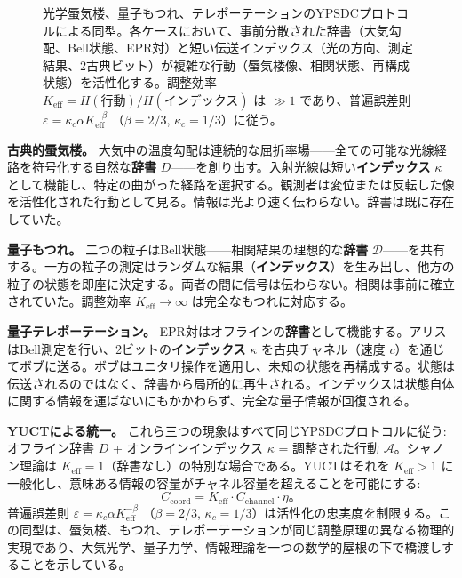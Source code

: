 \documentclass[12pt,a4paper]{article}
\theoremstyle{definition}
\theoremstyle{remark}
\begin{document}
\begin{figure}[htbp]
{%
		}
		\caption{光学蜃気楼、量子もつれ、テレポーテーションのYPSDCプロトコルによる同型。各ケースにおいて、事前分散された辞書（大気勾配、Bell状態、EPR対）と短い伝送インデックス（光の方向、測定結果、2古典ビット）が複雑な行動（蜃気楼像、相関状態、再構成状態）を活性化する。調整効率 $K_{\mathrm{eff}} = H(\text{行動})/H(\text{インデックス})$ は $\gg 1$ であり、普遍誤差則 $\varepsilon = \kappa_c \alpha K_{\mathrm{eff}}^{-\beta}$ （$\beta=2/3$, $\kappa_c=1/3$）に従う。}
		\label{fig:mirage-ypsdc}
	\end{figure}
	
	\textbf{古典的蜃気楼。}
	大気中の温度勾配は連続的な屈折率場——全ての可能な光線経路を符号化する自然な\textbf{辞書} $D$——を創り出す。入射光線は短い\textbf{インデックス} $\kappa$ として機能し、特定の曲がった経路を選択する。観測者は変位または反転した像を活性化された行動として見る。情報は光より速く伝わらない。辞書は既に存在していた。
	
	\textbf{量子もつれ。}
	二つの粒子はBell状態——相関結果の理想的な\textbf{辞書} $\mathcal{D}$——を共有する。一方の粒子の測定はランダムな結果（\textbf{インデックス}）を生み出し、他方の粒子の状態を即座に決定する。両者の間に信号は伝わらない。相関は事前に確立されていた。調整効率 $K_{\mathrm{eff}} \to \infty$ は完全なもつれに対応する。
	
	\textbf{量子テレポーテーション。}
	EPR対はオフラインの\textbf{辞書}として機能する。アリスはBell測定を行い、2ビットの\textbf{インデックス} $\kappa$ を古典チャネル（速度 $c$）を通じてボブに送る。ボブはユニタリ操作を適用し、未知の状態を再構成する。状態は伝送されるのではなく、辞書から局所的に再生される。インデックスは状態自体に関する情報を運ばないにもかかわらず、完全な量子情報が回復される。
	
	\textbf{YUCTによる統一。}
	これら三つの現象はすべて同じYPSDCプロトコルに従う: オフライン辞書 $D$ + オンラインインデックス $\kappa$ = 調整された行動 $\mathcal{A}$。シャノン理論は $K_{\mathrm{eff}}=1$（辞書なし）の特別な場合である。YUCTはそれを $K_{\mathrm{eff}}>1$ に一般化し、意味ある情報の容量がチャネル容量を超えることを可能にする:
	\[
	C_{\mathrm{coord}} = K_{\mathrm{eff}} \cdot C_{\mathrm{channel}} \cdot \eta。
	\]
	普遍誤差則 $\varepsilon = \kappa_c \alpha K_{\mathrm{eff}}^{-\beta}$ （$\beta=2/3$, $\kappa_c=1/3$）は活性化の忠実度を制限する。この同型は、蜃気楼、もつれ、テレポーテーションが同じ調整原理の異なる物理的実現であり、大気光学、量子力学、情報理論を一つの数学的屋根の下で橋渡しすることを示している。
	
\end{document}
